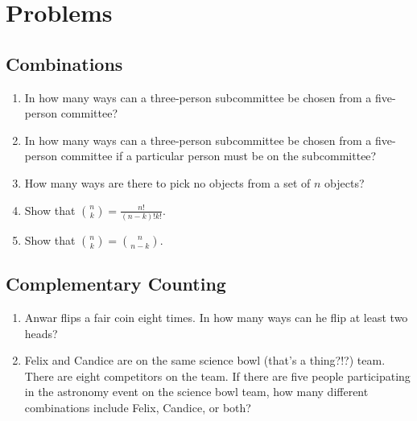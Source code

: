\documentclass[twocolumn]{article}
\begin{document}
\section*{Problems}

\subsection*{Combinations}
\begin{enumerate}
	\item In how many ways can a three-person subcommittee be chosen from a 
		five-person committee?
		\vspace{3cm}
	\item In how many ways can a three-person subcommittee be chosen from a 
		five-person committee if a particular person must be on the 
		subcommittee?
		\vspace{3cm}
	\item How many ways are there to pick no objects from a set of $n$ objects?
		\vspace{3cm}
	\item Show that $\binom{n}{k} = \frac{n!}{(n - k)!k!}$.
		\vspace{3cm}
	\item Show that $\binom{n}{k} = \binom{n}{n - k}$.
		\vspace{3cm}
\end{enumerate}

\subsection*{Complementary Counting}
\begin{enumerate}[resume]
	\item Anwar flips a fair coin eight times. In how many ways can he flip at 
		least two heads?
		\vspace{3cm}
	\item Felix and Candice are on the same science bowl (that's a thing?!?) 
		team. There are eight competitors on the team. If there are five people 
		participating in the astronomy event on the science bowl team, how many 
		different combinations include Felix, Candice, or both?
		\vspace{3cm}
\end{enumerate}
\end{document}
